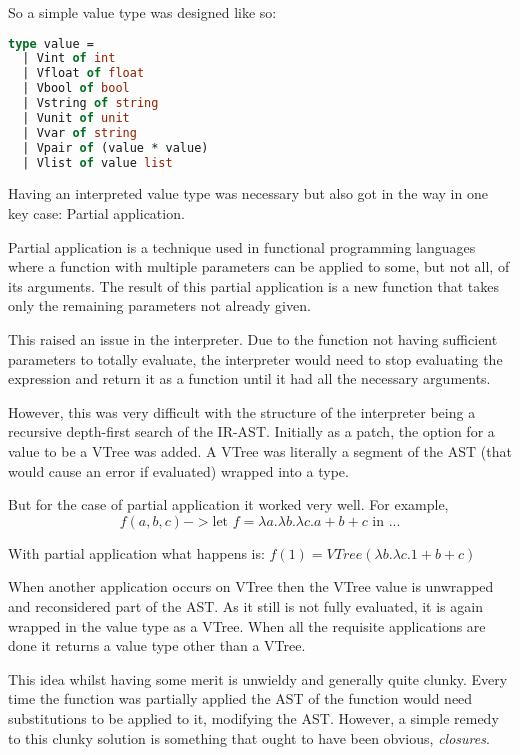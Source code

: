 \documentclass{l4proj}
\begin{document}
So a simple value type was designed like so:

\begin{lstlisting}[language=Caml, caption="PyFunc's Interpreter value type definition.]
type value = 
  | Vint of int 
  | Vfloat of float
  | Vbool of bool 
  | Vstring of string 
  | Vunit of unit 
  | Vvar of string 
  | Vpair of (value * value)
  | Vlist of value list
\end{lstlisting}

Having an interpreted value type was necessary but also got in the way in one key case: Partial application.

Partial application is a technique used in functional programming languages where a function with multiple parameters can be applied to some, but not all, of its arguments.
The result of this partial application is a new function that takes only the remaining parameters not already given.

This raised an issue in the interpreter.
Due to the function not having sufficient parameters to totally evaluate, the interpreter would need to stop evaluating the expression and return it as a function until it had all the necessary arguments.

However, this was very difficult with the structure of the interpreter being a recursive depth-first search of the IR-AST.
Initially as a patch, the option for a value to be a VTree was added.
A VTree was literally a segment of the AST (that would cause an error if evaluated) wrapped into a type.

But for the case of partial application it worked very well.
For example, \[ f(a, b, c) -> \text{let } f = \lambda a. \lambda b. \lambda c. a + b + c \text{ in ...}\]

With partial application what happens is: 
$f (1) = VTree (\lambda b. \lambda c. 1 + b + c)$

When another application occurs on VTree then the VTree value is unwrapped and reconsidered part of the AST.
As it still is not fully evaluated, it is again wrapped in the value type as a VTree.
When all the requisite applications are done it returns a value type other than a VTree.

This idea whilst having some merit is unwieldy and generally quite clunky.
Every time the function was partially applied the AST of the function would need substitutions to be applied to it, modifying the AST.
However, a simple remedy to this clunky solution is something that ought to have been obvious, \emph{closures}.
\end{document}
